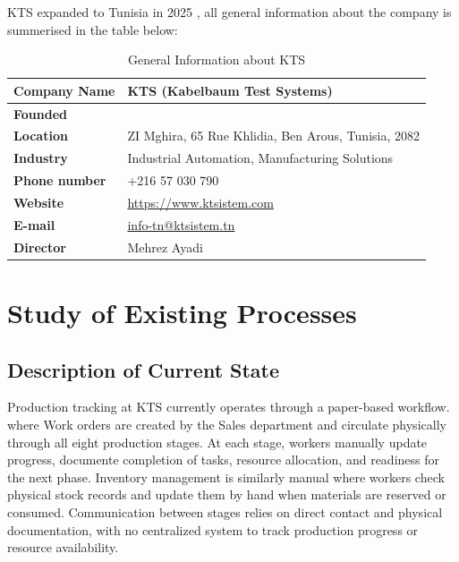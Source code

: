 KTS expanded to Tunisia in 2025 , all general information about the company is summerised in the table below:
\begin{table}[H]
    
    \begin{tabular}{|>{\raggedright\arraybackslash}p{4cm}|>{\raggedright\arraybackslash}p{10cm}|}
        \hline
        \textbf{Company Name} & KTS (Kabelbaum Test Systems) \\
        \hline
        \textbf{Founded} & 2025 \\
        \hline
        \textbf{Location} & 1 ZI Mghira, 65 Rue Khlidia, Ben Arous, Tunisia, 2082 \\
        \hline
        \textbf{Industry} & Industrial Automation, Manufacturing Solutions \\
        \hline
        \textbf{Phone number} & +216 57 030 790 \\
        \hline
        \textbf{Website} & \url{https://www.ktsistem.com} \\
        \hline
        \textbf{E-mail} & \url{info-tn@ktsistem.tn} \\
        \hline
        \textbf{Director} & Mehrez Ayadi \\
        \hline
    \end{tabular}
    \caption{General Information about KTS}
\end{table}





\section{Study of Existing Processes}

\subsection{Description of Current State}

Production tracking at KTS currently operates through a paper-based workflow.
where Work orders are created by the Sales department and circulate physically through all eight production stages.
At each stage, workers manually update progress, documente completion of tasks, resource allocation, and readiness for the next phase.
Inventory management is similarly manual where workers check physical stock records and update them by hand when materials are reserved or consumed.
Communication between stages relies on direct contact and physical documentation,
with no centralized system to track production progress or resource availability.


